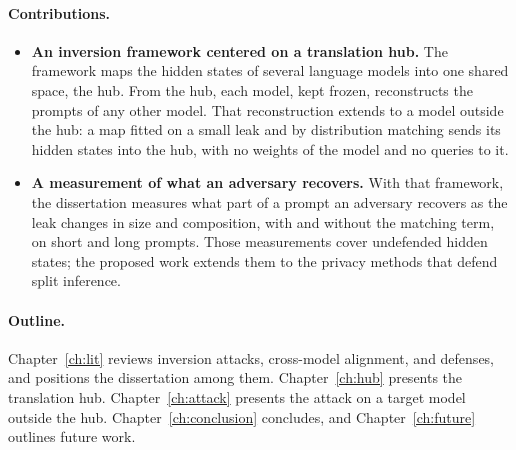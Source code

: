 \paragraph{Contributions.}
\begin{itemize}
\item \textbf{An inversion framework centered on a translation hub.} The framework maps the hidden states of several language models into one shared space, the hub.
From the hub, each model, kept frozen, reconstructs the prompts of any other model.
That reconstruction extends to a model outside the hub: a map fitted on a small leak and by distribution matching sends its hidden states into the hub, with no weights of the model and no queries to it.
\item \textbf{A measurement of what an adversary recovers.} With that framework, the dissertation measures what part of a prompt an adversary recovers as the leak changes in size and composition, with and without the matching term, on short and long prompts.
Those measurements cover undefended hidden states; the proposed work extends them to the privacy methods that defend split inference.
\end{itemize}

\paragraph{Outline.} Chapter~\ref{ch:lit} reviews inversion attacks, cross-model alignment, and defenses, and positions the dissertation among them.
Chapter~\ref{ch:hub} presents the translation hub.
Chapter~\ref{ch:attack} presents the attack on a target model outside the hub.
Chapter~\ref{ch:conclusion} concludes, and Chapter~\ref{ch:future} outlines future work.
